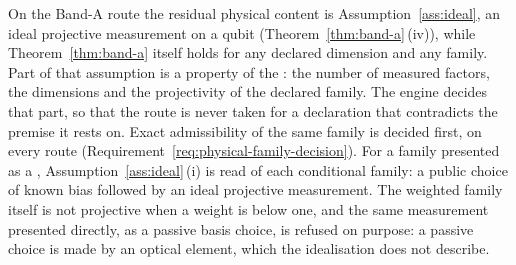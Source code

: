 On the Band-A route the residual physical content is
Assumption~\ref{ass:ideal}, an ideal projective measurement on a qubit
(Theorem~\ref{thm:band-a}\,(iv)), while
Theorem~\ref{thm:band-a} itself holds for any declared dimension and any
 family. Part of that assumption is a property of the
: the number of measured factors, the dimensions and the
projectivity of the declared family. The engine decides that part, so that the
route is never taken for a declaration that contradicts the premise it rests
on. Exact admissibility of the same family is decided first, on every route
(Requirement~\ref{req:physical-family-decision}). For a family presented as
a , Assumption~\ref{ass:ideal}\,(i) is read of
each conditional family: a public choice of known bias followed by an ideal
projective measurement. The weighted family itself is not projective when a
weight is below one, and the same measurement presented directly, as a
passive basis choice, is refused on purpose: a passive choice is made by an
optical element, which the idealisation does not describe.

